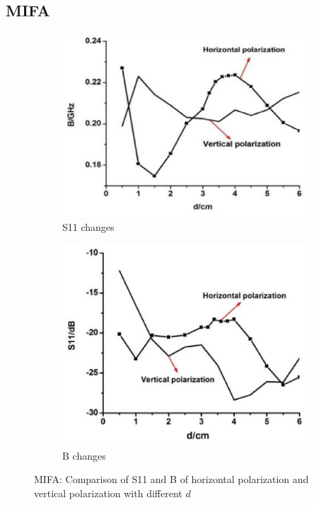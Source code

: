\documentclass[journal]{IEEEtran}
\begin{document}
\subsection{MIFA}
\begin{figure}[!htb]
\centering
\begin{subfigure}[b]{0.4\textwidth}
\includegraphics[width=\textwidth]{figs/8a.eps}
\caption{S11 changes}
\label{fig:8a}	
\end{subfigure}		
\begin{subfigure}[b]{0.4\textwidth}
\includegraphics[width=\textwidth]{figs/8b.eps}
\caption{B changes}
\label{fig:8b}
\end{subfigure}
\caption{MIFA: Comparison of S11 and B of horizontal polarization and vertical polarization with different $d$}
\label{fig:8}
\end{figure}
\end{document}
